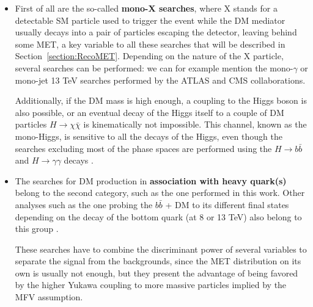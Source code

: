 \documentclass[a4paper, 10pt, openright]{report}
\begin{document}
\begin{itemize}
\item First of all are the so-called \textbf{mono-X searches}, where X stands for a detectable \ac{SM} particle used to trigger the event while the \ac{DM} mediator usually decays into a pair of particles escaping the detector, leaving behind some \ac{MET}, a key variable to all these searches that will be described in Section~\ref{section:RecoMET}. Depending on the nature of the X particle, several searches can be performed: we can for example mention the mono-$\gamma$ \cite{MonoGammaAtlas, MonoGammaCMS} or mono-jet \cite{MonoJetCMS, MonoJetCMS2} 13 TeV searches performed by the \ac{ATLAS} and \ac{CMS} collaborations.


Additionally, if the \ac{DM} mass is high enough, a coupling to the Higgs boson is also possible, or an eventual decay of the Higgs itself to a couple of \ac{DM} particles $H \rightarrow \chi \bar \chi$ is kinematically not impossible. This channel, known as the mono-Higgs, is sensitive to all the decays of the Higgs, even though the searches excluding most of the phase spaces are performed using the $H \rightarrow b \bar b$ and $H \rightarrow \gamma \gamma$ decays \cite{MonoHiggsAtlas, MonoHiggsCMS}. 

\item The searches for \ac{DM} production in \textbf{association with heavy quark(s)} belong to the second category, such as the one performed in this work. Other analyses such as the one probing the $b \bar b$ + DM to its different final states  depending on the decay of the bottom quark (at 8 or 13 TeV) also belong to this group \cite{PreviousDoubleTopAllLep8ATLAS, PreviousDoubleTopBottomAllLep13ATLAS}. 

These searches have to combine the discriminant power of several variables to separate the signal from the backgrounds, since the \ac{MET} distribution on its own is usually not enough, but they present the advantage of being favored by the higher Yukawa coupling to more massive particles implied by the \ac{MFV} assumption.


\end{itemize}
\end{document}
